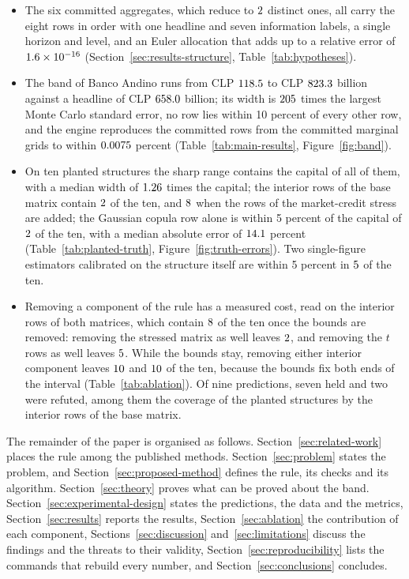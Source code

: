 \begin{itemize}
\item The six committed aggregates, which reduce to $2$ distinct ones, all carry the eight rows in order with one headline
and seven information labels, a single horizon and level, and an Euler allocation that adds up to a relative error of
$1.6\times 10^{-16}$ (Section~\ref{sec:results-structure}, Table~\ref{tab:hypotheses}).
\item The band of Banco Andino runs from CLP $118.5$ to CLP $823.3$ billion against a headline of CLP $658.0$ billion;
its width is $205$ times the largest Monte Carlo standard error, no row lies within 10 percent of every other row, and the engine reproduces the committed rows from the committed marginal grids to within $0.0075$ percent
(Table~\ref{tab:main-results}, Figure~\ref{fig:band}).
\item On ten planted structures the sharp range contains the capital of all of them, with a median width of $1.26$ times the capital; the interior rows of the base matrix contain
$2$ of the ten, and $8$ when the rows of the market-credit stress are added; the Gaussian copula row alone is within 5 percent of the capital of $2$ of the ten, with a median absolute error of $14.1$ percent
(Table~\ref{tab:planted-truth}, Figure~\ref{fig:truth-errors}). Two single-figure estimators calibrated on the structure itself are within 5 percent in $5$ of the ten.
\item Removing a component of the rule has a measured cost, read on the interior rows of both matrices, which contain $8$ of the ten once the bounds are removed: removing the stressed matrix as well
leaves $2$, and removing the $t$ rows as well leaves $5$. While the bounds stay, removing either interior component leaves $10$ and $10$ of the ten,
because the bounds fix both ends of the interval (Table~\ref{tab:ablation}). Of nine predictions, seven held and two were refuted, among them the coverage of the planted structures by the interior rows of the base matrix.
\end{itemize}

The remainder of the paper is organised as follows. Section~\ref{sec:related-work} places the rule among the published methods.
Section~\ref{sec:problem} states the problem, and Section~\ref{sec:proposed-method} defines the rule, its checks and its
algorithm. Section~\ref{sec:theory} proves what can be proved about the band. Section~\ref{sec:experimental-design} states the
predictions, the data and the metrics, Section~\ref{sec:results} reports the results, Section~\ref{sec:ablation} the contribution of each
component, Sections~\ref{sec:discussion} and~\ref{sec:limitations} discuss the findings and the threats to their validity, Section~\ref{sec:reproducibility} lists the commands that rebuild every number, and Section~\ref{sec:conclusions} concludes.
